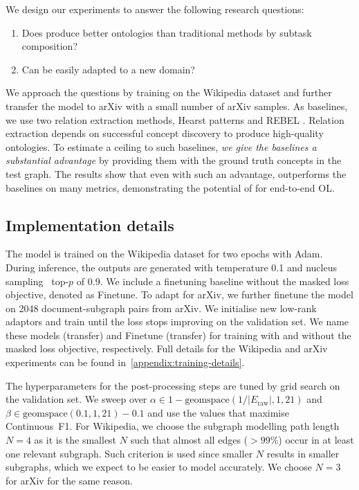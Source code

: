 We design our experiments to answer the following research questions:
\begin{enumerate}
    \item Does \name produce better ontologies than traditional methods by subtask composition?
    \item Can \name be easily adapted to a new domain?
\end{enumerate}
We approach the questions by training \name on the Wikipedia dataset and further transfer the model to arXiv with a small number of arXiv samples. As baselines, we use two relation extraction methods, Hearst patterns \cite{hearst1998automated,roller2018hearst} and REBEL \cite{cabot2021rebel}. Relation extraction depends on successful concept discovery to produce high-quality ontologies. To estimate a ceiling to such baselines, \emph{we give the baselines a substantial advantage} by providing them with the ground truth concepts in the test graph. The results show that even with such an advantage, \name outperforms the baselines on many metrics, demonstrating the potential of \name for end-to-end OL.

\subsection{Implementation details}  \label{sec:implementation}


The model is trained on the Wikipedia dataset for two epochs with Adam. During inference, the outputs are generated with temperature 0.1 and nucleus sampling~\cite{holtzman2019curious} top-$p$ of 0.9. We include a finetuning baseline without the masked loss objective, denoted as Finetune. To adapt \name for arXiv, we further finetune the model on 2048 document-subgraph pairs from arXiv. We initialise new low-rank adaptors and train until the loss stops improving on the validation set. We name these models \name (transfer) and Finetune (transfer) for training with and without the masked loss objective, respectively. Full details for the Wikipedia and arXiv experiments can be found in~\cref{appendix:training-details}.


The hyperparameters for the post-processing steps are tuned by grid search on the validation set. We sweep over $\alpha \in 1 - \text{geomspace}(1 / |E_\text{raw}|, 1, 21)$ and $\beta \in \text{geomspace}(0.1, 1, 21) - 0.1$ and use the values that maximise Continuous~F1. For Wikipedia, we choose the subgraph modelling path length $N=4$ as it is the smallest $N$ such that almost all edges ($>99\%$) occur in at least one relevant subgraph. Such criterion is used since smaller $N$ results in smaller subgraphs, which we expect to be easier to model accurately. We choose $N=3$ for arXiv for the same reason.


